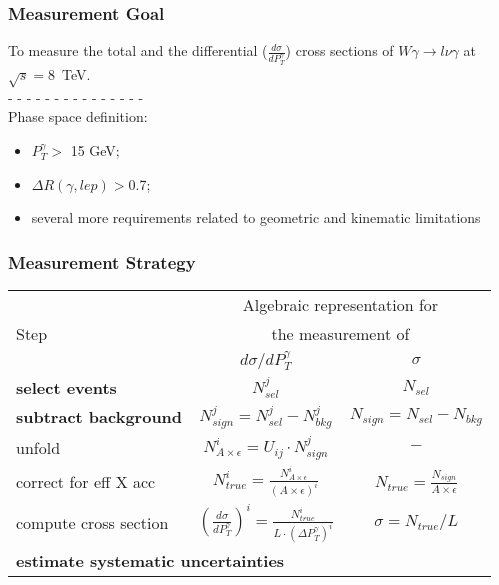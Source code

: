 \begin{frame}\frametitle{Measurement Goal}
  \scriptsize

  To measure the total and the differential ($\frac{d\sigma}{dP_T^{\gamma}}$) cross sections of $W\gamma\rightarrow l\nu\gamma$ at $\sqrt{s}=$8~TeV.\\
  - - - - - - - - - - - - - - - \\
  Phase space definition:
  \begin{itemize}
    \item $P_T^{\gamma}>$ 15 GeV;
    \item $\Delta{R}(\gamma,lep) > $0.7;
    \item several more requirements related to geometric and kinematic limitations
  \end{itemize}
\end{frame}%

\begin{frame}\frametitle{Measurement Strategy}
\begin{table}[h]
  \scriptsize
  \begin{center}
  \begin{tabular}{|l|c|c|}
    \hline
          & \multicolumn{2}{|c|}{Algebraic representation for} \\ 
     Step & \multicolumn{2}{|c|}{the measurement of} \\ 
          & $d\sigma/dP_{T}^{\gamma}$ & $\sigma$ \\ \hline
    {\bfseries\footnotesize{select events}} & {\bfseries{$N_{sel}^j$}} &    {\bfseries{$N_{sel}$}}       \\ \hline
    {\bfseries\footnotesize{subtract background}} & {\bfseries{$N_{sign}^j = N_{sel}^j - N_{bkg}^j$}} &    {\bfseries{$N_{sign}=N_{sel}-N_{bkg}$}}       \\ \hline
    unfold   & $N_{A\times\epsilon}^i = U_{ij} \cdot N_{sign}^j$ &    $-$       \\ \hline
    correct for eff X acc & $N_{true}^i = \frac{N_{A\times\epsilon}^i}{(A \times\epsilon)^i}$ &  $N_{true}=\frac{N_{sign}}{A\times\epsilon}$       \\ \hline
    compute cross section & $ \left( \frac{d\sigma}{dP_{T}^\gamma} \right) ^i = \frac{N_{true}^i}{L \cdot (\Delta P_T^\gamma)^i}$  &  $\sigma = N_{true}/L$       \\ \hline
    \multicolumn{3}{|l|}{\bfseries\footnotesize{estimate systematic uncertainties}}          \\ \hline
  \end{tabular}
  \label{tab:analysisOutline}
  \end{center}
\end{table}
\end{frame}%

